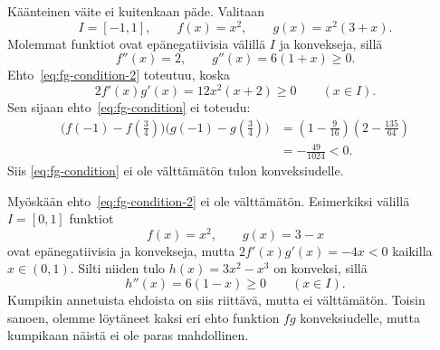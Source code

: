 \documentclass[11pt,a4paper]{amsart}
\begin{document}
\begin{solution}
  \begin{samepage}
    Käänteinen väite ei kuitenkaan päde. Valitaan
    \[
      I = [-1, 1], \qquad f(x) = x^2, \qquad g(x) = x^2(3 + x).
    \]
    Molemmat funktiot ovat epänegatiivisia välillä \(I\) ja konvekseja, sillä
    \[
      f''(x) = 2, \qquad g''(x) = 6(1 + x) \geq 0.
    \]
    Ehto~\eqref{eq:fg-condition-2} toteutuu, koska
    \[
      2f'(x)g'(x) = 12x^2(x + 2) \geq 0
      \qquad (x \in I).
    \]
    Sen sijaan ehto~\eqref{eq:fg-condition} ei toteudu:
    \[
      \begin{aligned}
        \bigl(f(-1) - f(\tfrac34)\bigr)
        \bigl(g(-1) - g(\tfrac34)\bigr)
        &= \left(1 - \frac9{16}\right)
        \left(2 - \frac{135}{64}\right) \\
        &= -\frac{49}{1024} < 0.
      \end{aligned}
    \]
    Siis \eqref{eq:fg-condition} ei ole välttämätön tulon konveksiudelle.\par
  \end{samepage}

  \begin{samepage}
    Myöskään ehto~\eqref{eq:fg-condition-2} ei ole välttämätön.
    Esimerkiksi välillä \(I = [0, 1]\) funktiot
    \[
      f(x) = x^2, \qquad g(x) = 3 - x
    \]
    ovat epänegatiivisia ja konvekseja, mutta
    \(2f'(x)g'(x) = -4x < 0\) kaikilla \(x \in (0, 1)\).
    Silti niiden tulo \(h(x) = 3x^2 - x^3\) on konveksi, sillä
    \[
      h''(x) = 6(1 - x) \geq 0
      \qquad (x \in I).
    \]
    Kumpikin annetuista ehdoista on siis riittävä, mutta ei
    välttämätön. Toisin sanoen, olemme löytäneet kaksi eri ehto funktion
    \(fg\) konveksiudelle, mutta kumpikaan näistä ei ole paras
    mahdollinen. \qedhere\par
  \end{samepage}
\end{solution}
\end{document}
